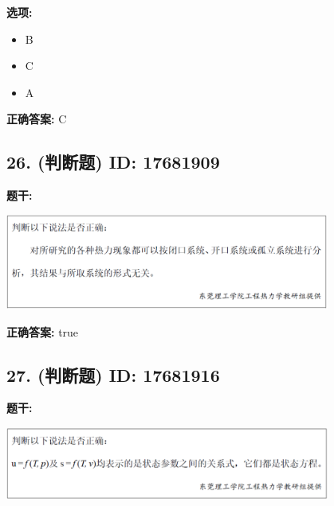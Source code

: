 \documentclass[12pt]{article}
\begin{document}
\textbf{选项:}
\begin{itemize}[leftmargin=*]
  \item B

  \item C

  \item A

\end{itemize}

\textbf{正确答案:}
C

\vspace{0.5em}\hrulefill\vspace{1em}

\subsection*{26. (判断题) \small ID: 17681909}

\textbf{题干:}


\begin{center}\includegraphics[width=0.8\textwidth, height=0.25\textheight, keepaspectratio]{question_26_17681909/title_img_1.png}\end{center}

\textbf{正确答案:}
true

\vspace{0.5em}\hrulefill\vspace{1em}

\subsection*{27. (判断题) \small ID: 17681916}

\textbf{题干:}


\begin{center}\includegraphics[width=0.8\textwidth, height=0.25\textheight, keepaspectratio]{question_27_17681916/title_img_1.png}\end{center}
\end{document}
